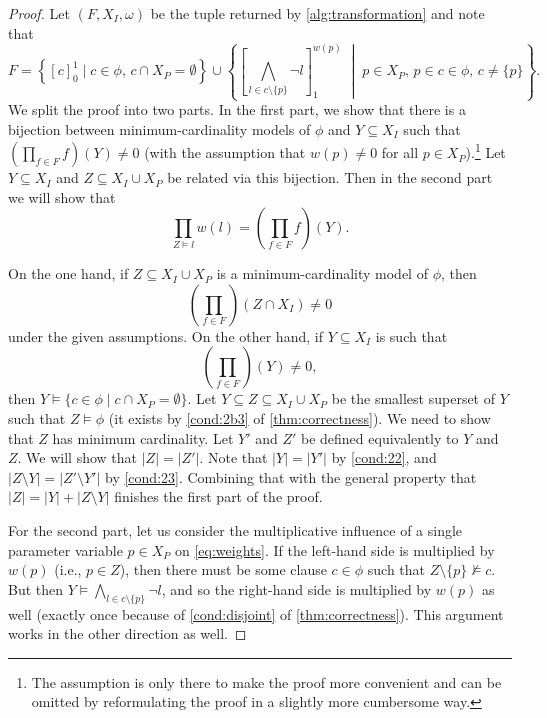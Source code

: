 \documentclass[runningheads]{llncs}
\begin{document}


\begin{proof}
  Let $(F, X_I, \omega)$ be the tuple returned by \cref{alg:transformation} and
  note that
  \[
    F = \left\{ [c]_0^1 \mid c \in \phi \text{, } c \cap X_P = \emptyset
    \right\} \cup \left\{ \left[ \bigwedge_{l \in c \setminus \{ p \}} \neg l
      \right]_1^{w(p)} \;\middle|\; p \in X_P \text{, } p \in c \in \phi
      \text{, } c \ne \{ p \} \right\}.
  \]
  We split the proof into two parts. In the first part, we show that there is a
  bijection between minimum-cardinality models of $\phi$ and $Y \subseteq X_I$
  such that $\left(\prod_{f \in F} f\right)(Y) \ne 0$ (with the assumption that
  $w(p) \ne 0$ for all $p \in X_P$).\footnote{The assumption is only there to
    make the proof more convenient and can be omitted by reformulating the proof
    in a slightly more cumbersome way.} Let $Y \subseteq X_I$ and $Z \subseteq
  X_I \cup X_P$ be related via this bijection. Then in the second part we will
  show that
  \begin{equation} \label{eq:weights}
    \prod_{Z \models l} w(l) = \left(\prod_{f \in F} f\right)(Y).
  \end{equation}

  On the one hand, if $Z \subseteq X_I \cup X_P$ is a minimum-cardinality model
  of $\phi$, then
  \[
    \left(\prod_{f \in F}\right)(Z \cap X_I) \ne 0
  \]
  under the given assumptions. On the other hand, if $Y \subseteq X_I$ is such
  that
  \[
    \left(\prod_{f \in F}\right)(Y) \ne 0,
  \]
  then $Y \models \{ c \in \phi \mid c \cap X_P = \emptyset \}$. Let $Y
  \subseteq Z \subseteq X_I \cup X_P$ be the smallest superset of $Y$ such that
  $Z \models \phi$ (it exists by \cref{cond:2b3} of \cref{thm:correctness}). We
  need to show that $Z$ has minimum cardinality. Let $Y'$ and $Z'$ be defined
  equivalently to $Y$ and $Z$. We will show that $|Z| = |Z'|$. Note that $|Y| =
  |Y'|$ by \cref{cond:22}, and $|Z \setminus Y| = |Z' \setminus Y'|$ by
  \cref{cond:23}. Combining that with the general property that $|Z| = |Y| + |Z
  \setminus Y|$ finishes the first part of the proof.

  For the second part, let us consider the multiplicative influence of a single
  parameter variable $p \in X_P$ on \cref{eq:weights}. If the left-hand side is
  multiplied by $w(p)$ (i.e., $p \in Z$), then there must be some clause $c \in
  \phi$ such that $Z \setminus \{ p \} \not\models c$. But then $Y \models
  \bigwedge_{l \in c \setminus \{ p \}} \neg l$, and so the right-hand side is
  multiplied by $w(p)$ as well (exactly once because of \cref{cond:disjoint} of
  \cref{thm:correctness}). This argument works in the other direction as well.
\end{proof}
\end{document}
